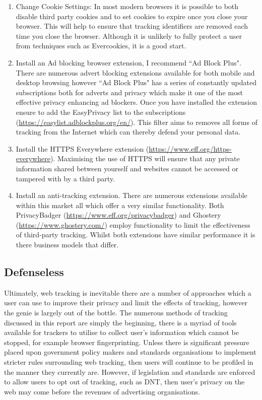 \documentclass[12pt]{article}
\begin{document}
\begin{enumerate}
    \item Change Cookie Settings: In most modern browsers it is possible to both disable third party cookies and to set cookies to expire once you close your browser. This will help to ensure that tracking identifiers are removed each time you close the browser. Although it is unlikely to fully protect a user from techniques such as Evercookies, it is a good start. 
    \item Install an Ad blocking browser extension, I recommend ``Ad Block Plus". There are numerous advert blocking extensions available for both mobile and desktop browsing however ``Ad Block Plus" has a series of constantly updated subscriptions both for adverts and privacy which make it one of the most effective privacy enhancing ad blockers. Once you have installed the extension ensure to add the EasyPrivacy list to the subscriptions (\url{https://easylist.adblockplus.org/en/}). This filter aims to removes all forms of tracking from the Internet which can thereby defend your personal data.
    \item Install the HTTPS Everywhere extension (\url{https://www.eff.org/https-everywhere}). Maximising the use of HTTPS will ensure that any private information shared between yourself and websites cannot be accessed or tampered with by a third party. 
    \item Install an anti-tracking extension. There are numerous extensions available within this market all which offer a very similar functionality. Both PrivacyBadger (\url{https://www.eff.org/privacybadger}) and Ghostery (\url{https://www.ghostery.com/}) employ functionality to limit the effectiveness of third-party tracking. Whilst both extensions have similar performance it is there business models that differ. 
\end{enumerate}

\subsection{Defenseless}
Ultimately, web tracking is inevitable there are a number of approaches which a user can use to improve their privacy and limit the effects of tracking, however the genie is largely out of the bottle. The numerous methods of tracking discussed in this report are simply the beginning, there is a myriad of tools available for trackers to utilise to collect user's information which cannot be stopped, for example browser fingerprinting. Unless there is significant pressure placed upon government policy makers and standards organisations to implement stricter rules surrounding web tracking, then users will continue to be profiled in the manner they currently are. However, if legislation and standards are enforced to allow users to opt out of tracking, such as DNT, then user's privacy on the web may come before the revenues of advertising organisations.   
\end{document}
